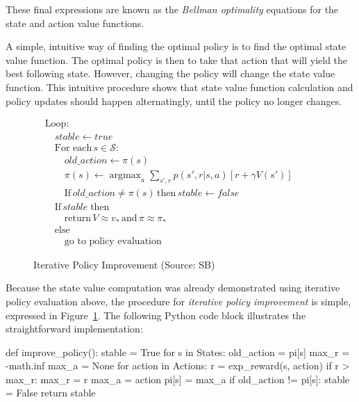 These final expressions are known as the \emph{Bellman optimality} equations for the state and action value functions.

A simple, intuitive way of finding the optimal policy is to find the optimal state value function. The optimal policy is then to take that action that will yield the best following state. However, changing the policy will change the state value function. This intuitive procedure shows that state value function calculation and policy updates should happen alternatingly, until the policy no longer changes. 

\begin{figure}
\begin{pseudocodebox}
\small
\vspace{-\baselineskip}
\begin{align*}
&\text{Loop:} \\
&\quad stable \leftarrow true \\
&\quad \text{For each}\, s \in \mathcal{S}: \\
&\quad \quad old\_action \leftarrow \pi(s) \\
&\quad \quad \pi (s) \leftarrow \operatorname*{argmax}\nolimits_a \sum\nolimits_{s', r} p(s', r|s, a) [r + \gamma V(s')] \hspace{1in} \\
&\quad \quad \text{If}\, old\_action \neq \pi(s) \, \text{then} \, stable \leftarrow false \\
&\quad \text{If}\, stable \; \text{then} \\
&\quad \quad \text{return}\, V \approx v_*\, \text{and} \, \pi \approx \pi_* \\
&\quad \text{else} \\
&\quad \quad \text{go to policy evaluation}
\end{align*}
\end{pseudocodebox}
\caption{Iterative Policy Improvement (Source: SB)}
\label{fig:policyimprovement}
\end{figure}

Because the state value computation was already demonstrated using iterative policy evaluation above, the procedure for \emph{iterative policy improvement} is simple, expressed in Figure~\ref{fig:policyimprovement}. The following Python code block illustrates the straightforward implementation:

\begin{pythoncode}
def improve_policy():
    stable = True
    for s in States:
        old_action = pi[s]
        max_r = -math.inf
        max_a = None
        for action in Actions:
            r = exp_reward(s, action)
            if r > max_r:
                max_r = r
                max_a = action
        pi[s] = max_a
        if old_action != pi[s]:
            stable = False
    return stable
\end{pythoncode}

